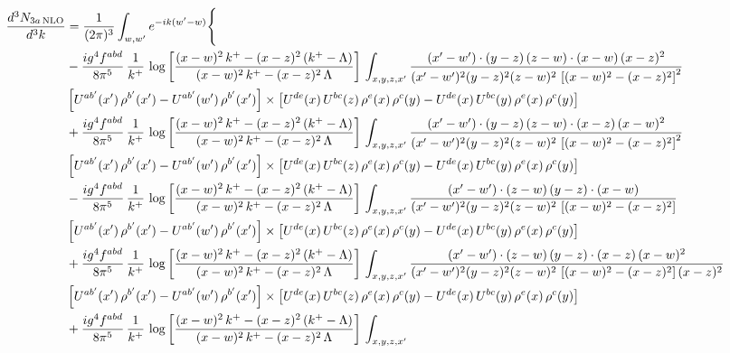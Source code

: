 \documentclass[9pt]{article}
\numberwithin{equation}{section}
\begin{document}
\begin{align}
\frac{d^{3}N_{3a\,\rm NLO}}{d^{3}k} & =\frac{1}{(2\pi)^{3}}\int_{w,w'}e^{-ik(w'-w)}\Bigg\{\notag \\ &  
-\frac{ig^{4}f^{abd}}{8\pi^{5}}\,\frac{1}{k^{+}}\,\log{\left[\frac{(x-w)^{2}\,k^{+}-(x-z)^{2}\,(k^{+}-\Lambda)}{(x-w)^{2}\,k^{+}-(x-z)^{2}\,\Lambda}\right]}\,\int_{x,y,z,x'}
\frac{(x'-w')\cdot(y-z)\,(z-w)\cdot(x-w)\,(x-z)^{2}}{(x'-w')^{2}(y-z)^{2}(z-w)^{2}\,\left[(x-w)^{2}-(x-z)^{2}\right]^{2}}\notag \\ & \left[U^{ab'}(x')\,\rho^{b'}(x')-U^{ab'}(w')\, \rho^{b'}(x')\right]\times \left[U^{de}(x)\,U^{bc}(z)\, \rho^{e}(x)\,\rho^{c}(y)-U^{de}(x)\,U^{bc}(y)\,\rho^{e}(x)\,\rho^{c}(y)\right]\notag \\ & +\frac{ig^{4}f^{abd}}{8\pi^{5}}\,\frac{1}{k^{+}}\,\log{\left[\frac{(x-w)^{2}\,k^{+}-(x-z)^{2}\,(k^{+}-\Lambda)}{(x-w)^{2}\,k^{+}-(x-z)^{2}\,\Lambda}\right]}\,\int_{x,y,z,x'}
\frac{(x'-w')\cdot(y-z)\,(z-w)\cdot(x-z)\,(x-w)^{2}}{(x'-w')^{2}(y-z)^{2}(z-w)^{2}\,\left[(x-w)^{2}-(x-z)^{2}\right]^{2}}\notag \\ 
&\left[U^{ab'}(x')\,\rho^{b'}(x')-U^{ab'}(w')\, \rho^{b'}(x')\right]\times \left[U^{de}(x)\,U^{bc}(z)\, \rho^{e}(x)\,\rho^{c}(y)-U^{de}(x)\,U^{bc}(y)\,\rho^{e}(x)\,\rho^{c}(y)\right]\notag \\ & -\frac{ig^{4}f^{abd}}{8\pi^{5}}\,\frac{1}{k^{+}}\,\log{\left[\frac{(x-w)^{2}\,k^{+}-(x-z)^{2}\,(k^{+}-\Lambda)}{(x-w)^{2}\,k^{+}-(x-z)^{2}\,\Lambda}\right]}\,\int_{x,y,z,x'}
\frac{(x'-w')\cdot(z-w)\,(y-z)\cdot(x-w)}{(x'-w')^{2}(y-z)^{2}(z-w)^{2}\,\left[(x-w)^{2}-(x-z)^{2}\right]}\notag \\ & \left[U^{ab'}(x')\,\rho^{b'}(x')-U^{ab'}(w')\, \rho^{b'}(x')\right]\times \left[U^{de}(x)\,U^{bc}(z)\, \rho^{e}(x)\,\rho^{c}(y)-U^{de}(x)\,U^{bc}(y)\,\rho^{e}(x)\,\rho^{c}(y)\right]\notag \\ &  +\frac{ig^{4}f^{abd}}{8\pi^{5}}\,\frac{1}{k^{+}}\,\log{\left[\frac{(x-w)^{2}\,k^{+}-(x-z)^{2}\,(k^{+}-\Lambda)}{(x-w)^{2}\,k^{+}-(x-z)^{2}\,\Lambda}\right]}\,\int_{x,y,z,x'}
\frac{(x'-w')\cdot(z-w)\,(y-z)\cdot(x-z)\,(x-w)^{2}}{(x'-w')^{2}(y-z)^{2}(z-w)^{2}\,\left[(x-w)^{2}-(x-z)^{2}\right](x-z)^{2}}\notag \\ & \left[U^{ab'}(x')\,\rho^{b'}(x')-U^{ab'}(w')\, \rho^{b'}(x')\right]\times \left[U^{de}(x)\,U^{bc}(z)\, \rho^{e}(x)\,\rho^{c}(y)-U^{de}(x)\,U^{bc}(y)\,\rho^{e}(x)\,\rho^{c}(y)\right]\notag \\ & +\frac{ig^{4}f^{abd}}{8\pi^{5}}\,\frac{1}{k^{+}}\,\log{\left[\frac{(x-w)^{2}\,k^{+}-(x-z)^{2}\,(k^{+}-\Lambda)}{(x-w)^{2}\,k^{+}-(x-z)^{2}\,\Lambda}\right]}\,\int_{x,y,z,x'}

\end{align}
\end{document}
